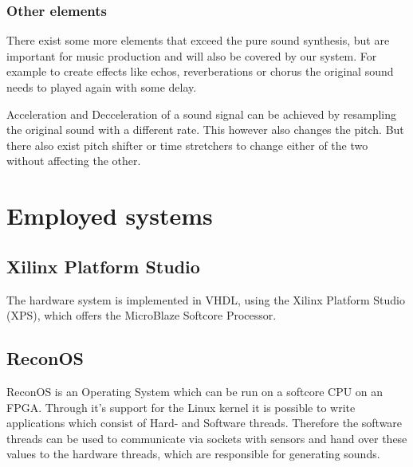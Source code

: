 			\subsubsection{Other elements}
				There exist some more elements that exceed the pure sound synthesis, but are important for music production and will also be covered by our system.
				For example to create effects like echos, reverberations or chorus the original sound needs to played again with some delay.
			
				Acceleration and Decceleration of a sound signal can be achieved by resampling the original sound with a different rate. This however also changes the pitch.
				But there also exist pitch shifter or time stretchers to change either of the two without affecting the other.
		
		
		
			
			
			
		
	\section{Employed systems}
	  \subsection{Xilinx Platform Studio}
	    The hardware system is implemented in VHDL, using the Xilinx Platform Studio (XPS), which offers the MicroBlaze Softcore Processor.
	  \subsection{ReconOS}
		ReconOS is an Operating System which can be run on a softcore CPU on an FPGA. Through it's support for the Linux kernel it is possible to write applications which consist of Hard- and Software threads. Therefore the software threads can be used to communicate via sockets with sensors and hand over these values to the hardware threads, which are responsible for generating sounds.

